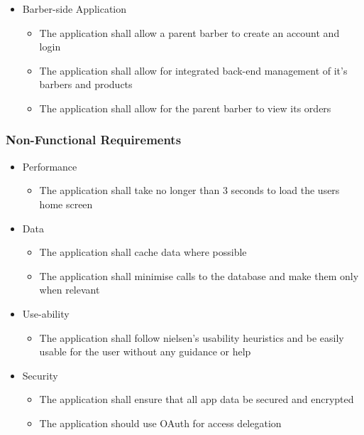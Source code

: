 \documentclass[12pt]{article}
\begin{document}
	\begin{itemize}
		\item Barber-side Application
		\begin{itemize}
			\item The application shall allow a parent barber to create an account and login
			\item The application shall allow for integrated back-end management of it's barbers and products
			\item The application shall allow for the parent barber to view its orders
		\end{itemize}
	\end{itemize}
	
	\subsubsection{Non-Functional Requirements}
	
	\begin{itemize}
		\item Performance
		\begin{itemize}
			\item The application shall take no longer than 3 seconds to load the users home screen
		\end{itemize}
	\end{itemize}

	\begin{itemize}
	\item Data
	\begin{itemize}
		\item The application shall cache data where possible
		\item The application shall minimise calls to the database and make them only when relevant
	\end{itemize}
	\end{itemize}

	\begin{itemize}
		\item Use-ability
		\begin{itemize}
			\item The application shall follow nielsen's usability heuristics and be easily usable for the user without any guidance or help
		\end{itemize}
	\end{itemize}

	\begin{itemize}
		\item Security
		\begin{itemize}
			\item The application shall ensure that all app data be secured and encrypted
			\item The application should use OAuth for access delegation
		\end{itemize}
	\end{itemize}
\end{document}
